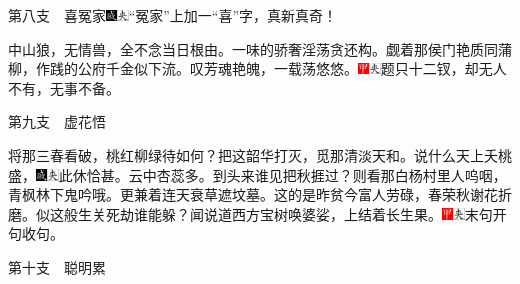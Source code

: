 第八支　喜冤家{\includegraphics[width=3mm]{../Images/00005}\includegraphics[width=3mm]{../Images/00012}\footnotesize \kaishu ``冤家''上加一``喜''字，真新真奇！}

中山狼，无情兽，全不念当日根由。一味的骄奢淫荡贪还构。觑着那侯门艳质同蒲柳，作践的公府千金似下流。叹芳魂艳魄，一载荡悠悠。{\includegraphics[width=3mm]{../Images/00002}\includegraphics[width=3mm]{../Images/00012}\footnotesize \kaishu 题只十二钗，却无人不有，无事不备。}

第九支　虚花悟

将那三春看破，桃红柳绿待如何？把这韶华打灭，觅那清淡天和。说什么天上夭桃盛，{\includegraphics[width=3mm]{../Images/00005}\includegraphics[width=3mm]{../Images/00012}\footnotesize \kaishu 此休恰甚。}云中杏蕊多。到头来谁见把秋捱过？则看那白杨村里人呜咽，青枫林下鬼吟哦。更兼着连天衰草遮坟墓。这的是昨贫今富人劳碌，春荣秋谢花折磨。似这般生关死劫谁能躲？闻说道西方宝树唤婆娑，上结着长生果。{\includegraphics[width=3mm]{../Images/00002}\includegraphics[width=3mm]{../Images/00012}\footnotesize \kaishu 末句开句收句。}

第十支　聪明累

